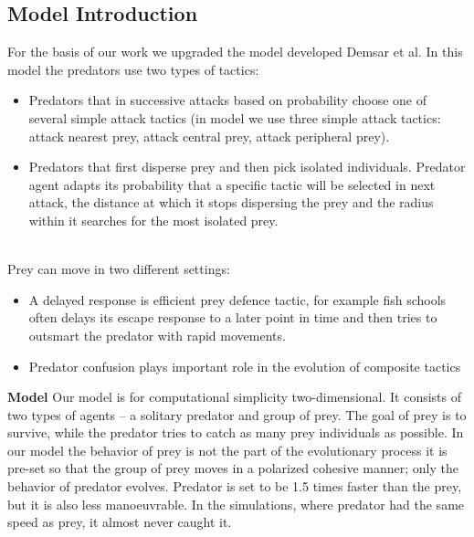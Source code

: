 \documentclass[internal]{FRIreport}
\begin{document}
\subsection{Model Introduction} \label{sssec:tactics}
For the basis of our work we upgraded the model developed Demsar et al. \cite{demvsar2015simulating} In this model the predators use two types of tactics: \\
\begin{itemize}
\item Predators that in successive attacks based on probability choose one of several simple attack tactics  (in model we use three simple attack tactics: attack nearest prey, attack central prey, attack peripheral prey).\\
\item Predators that first disperse prey and then pick isolated individuals. Predator agent adapts its probability that a specific tactic will be selected in next attack, the distance at which it stops dispersing the prey and the radius within it searches for the most isolated prey.
\end{itemize}
~\\
Prey can move in two different settings:\\
\begin{itemize}
\item A delayed response is efficient prey defence tactic, for example fish schools often delays its escape response to a later point in time and then tries to outsmart the predator with rapid movements.\\
\item Predator confusion plays important role in the evolution of composite tactics\\
\end{itemize}
\textbf{Model}
Our model is for computational simplicity two-dimensional. It consists of two types of agents -- a solitary predator and group of prey. The goal of prey is to survive, while the predator tries to catch as many prey individuals as possible. In our model the behavior of prey is not the part of the evolutionary process it is pre-set so that the group of prey moves in a polarized cohesive manner; only the behavior of predator evolves. Predator is set to be 1.5 times faster than the prey, but it is also less manoeuvrable. In the simulations, where predator had the same speed as prey, it almost never caught it.\\

\end{document}
